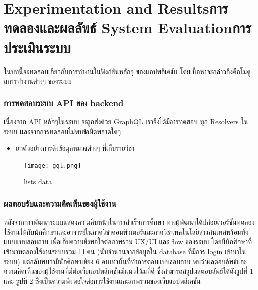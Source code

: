 \chapter{\ifproject%
\ifenglish Experimentation and Results\else การทดลองและผลลัพธ์\fi
\else%
\ifenglish System Evaluation\else การประเมินระบบ\fi
\fi}

ในบทนี้จะทดสอบเกี่ยวกับการทํางานในฟังก์ชันหลักๆ ของแอปพลิเคชัน โดยเนื้อหาจะกล่าวถึงคือโมดูลการทํางานต่างๆ ของระบบ

\subsection{การทดสอบระบบ API ของ backend}
เนื่องจาก API หลักๆในระบบ จะถูกส่งด้วย GraphQL เราจึงได้มีการทดสอบ ทุก Resolvers ในระบบ เเละจากการทดสอบไม่พบข้อผิดพลาดใดๆ
\begin{center}
    \begin{minipage}[c]{0.5\linewidth}
       \begin{itemize}
         \item ยกตัวอย่างการดึงข้อมูลหมวดต่างๆ ที่เก็บรายวิชา
       \end{itemize}
    \end{minipage}
  \end{center}

  \begin{figure}[H]
    \begin{center}
      \texttt{[image: gql.png]}
      \caption{lists data}
      \label{fig:gql}
    \end{center}
  \end{figure}
    
\subsection{ผลตอบรับและความคิดเห็นของผู้ใช้งาน}
หลังจากการพัฒนาระบบแสดงความคืบหน้าในการสำเร็จการศึกษา 
ทางผู้พัฒนาได้ปล่อยเวอร์ชันทดลองใช้งานให้กับนักศึกษาและอาจารย์ในภาควิชาคอมพิวเตอร์และภาควิชาเทคโนโลยีสารสนเทศพร้อมทั้งแนบแบบสอบถาม
เพื่อเก็บความพึงพอใจต่อภาพรวม UX/UI และ flow ของระบบ โดยมีนักศึกษาที่เข้ามาทดลองใช้งานระบบรวม 11 คน 
(นับจำนวนจากข้อมูลใน database ที่มีการ login เข้ามาในระบบ) แต่กลับพบว่ามีนักศึกษาเพียง 6 คนเท่านั้นที่ทำการตอบแบบสอบถาม 
พบว่าผลตอบลัพธ์และความคิดเห็นของผู้ใช้งานที่มีต่อเว็บแอปพลิเคชันมีแนวโน้มที่ดี ซึ่งสามารถสรุปผลตอบลัพธ์ได้ดังรูปที่ 1 และ รูปที่ 2 
ซึ่งเป็นความพีงพอใจต่อการใช้งานและภาพรวมของเว็บแอปพลิเคชัน

